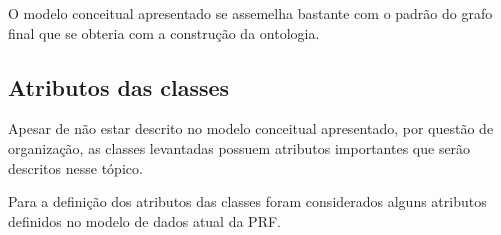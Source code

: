 	  O modelo conceitual apresentado se assemelha bastante com o padrão do grafo final que se obteria com a construção da
	  ontologia.
      
      \vfill
      \pagebreak
      \subsection{Atributos das classes}
	
	  Apesar de não estar descrito no modelo conceitual apresentado, por questão de organização, as classes levantadas
	  possuem atributos importantes que serão descritos nesse tópico.
	  
	  Para a definição dos atributos das classes foram considerados alguns atributos definidos no modelo de dados atual
	  da PRF.
	  
	  
      
%       
% 	
% 	
% 	
% 	
%       
